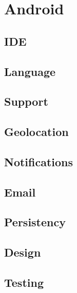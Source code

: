 \section{Android}

\subsection{IDE}

\subsection{Language}

\subsection{Support}

\subsection{Geolocation}

\subsection{Notifications}

\subsection{Email}

\subsection{Persistency}

\subsection{Design}

\subsection{Testing}
